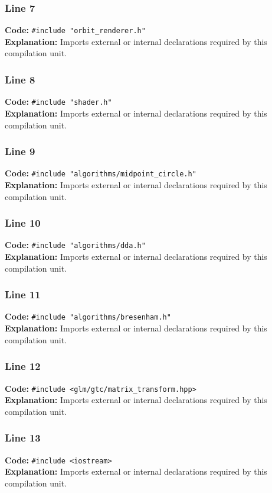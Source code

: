 \documentclass[11pt,a4paper]{article}
\begin{document}
\subsubsection*{Line 7}
\textbf{Code:} \verb|#include "orbit_renderer.h"|\\
\textbf{Explanation:} Imports external or internal declarations required by this compilation unit.

\subsubsection*{Line 8}
\textbf{Code:} \verb|#include "shader.h"|\\
\textbf{Explanation:} Imports external or internal declarations required by this compilation unit.

\subsubsection*{Line 9}
\textbf{Code:} \verb|#include "algorithms/midpoint_circle.h"|\\
\textbf{Explanation:} Imports external or internal declarations required by this compilation unit.

\subsubsection*{Line 10}
\textbf{Code:} \verb|#include "algorithms/dda.h"|\\
\textbf{Explanation:} Imports external or internal declarations required by this compilation unit.

\subsubsection*{Line 11}
\textbf{Code:} \verb|#include "algorithms/bresenham.h"|\\
\textbf{Explanation:} Imports external or internal declarations required by this compilation unit.

\subsubsection*{Line 12}
\textbf{Code:} \verb|#include <glm/gtc/matrix_transform.hpp>|\\
\textbf{Explanation:} Imports external or internal declarations required by this compilation unit.

\subsubsection*{Line 13}
\textbf{Code:} \verb|#include <iostream>|\\
\textbf{Explanation:} Imports external or internal declarations required by this compilation unit.
\end{document}
